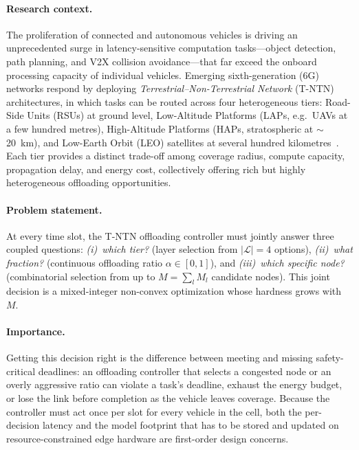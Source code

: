 \documentclass[11pt,a4paper]{article}
\theoremstyle{definition}
\begin{document}
\paragraph{Research context.}
The proliferation of connected and autonomous vehicles is driving an unprecedented surge in latency-sensitive computation tasks---object detection, path planning, and V2X collision avoidance---that far exceed the onboard processing capacity of individual vehicles. Emerging sixth-generation (6G) networks respond by deploying \emph{Terrestrial--Non-Terrestrial Network} (T-NTN) architectures, in which tasks can be routed across four heterogeneous tiers: Road-Side Units (RSUs) at ground level, Low-Altitude Platforms (LAPs, e.g.\ UAVs at a few hundred metres), High-Altitude Platforms (HAPs, stratospheric at $\sim$20~km), and Low-Earth Orbit (LEO) satellites at several hundred kilometres~\cite{hrl_ntn}. Each tier provides a distinct trade-off among coverage radius, compute capacity, propagation delay, and energy cost, collectively offering rich but highly heterogeneous offloading opportunities.

\paragraph{Problem statement.}
At every time slot, the T-NTN offloading controller must jointly answer three coupled questions: \emph{(i)~which tier?} (layer selection from $|\mathcal{L}|=4$ options), \emph{(ii)~what fraction?} (continuous offloading ratio $\alpha \in [0,1]$), and \emph{(iii)~which specific node?} (combinatorial selection from up to $M = \sum_l M_l$ candidate nodes). This joint decision is a mixed-integer non-convex optimization whose hardness grows with $M$.

\paragraph{Importance.}
Getting this decision right is the difference between meeting and missing safety-critical deadlines: an offloading controller that selects a congested node or an overly aggressive ratio can violate a task's deadline, exhaust the energy budget, or lose the link before completion as the vehicle leaves coverage. Because the controller must act once per slot for every vehicle in the cell, both the per-decision latency and the model footprint that has to be stored and updated on resource-constrained edge hardware are first-order design concerns.
\end{document}
